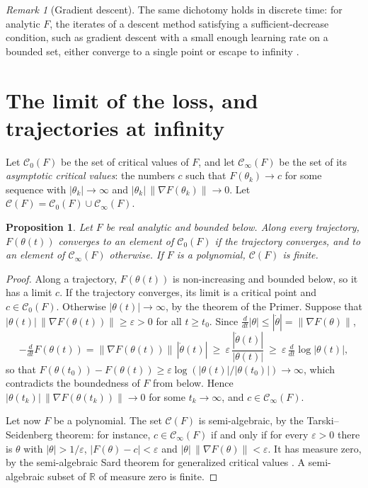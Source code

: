 \documentclass[11pt]{article}
\newtheorem{proposition}[lemma]{Proposition}
\theoremstyle{definition}
\theoremstyle{remark}
\newtheorem{remark}[lemma]{Remark}
\newcommand{\R}{\mathbb{R}}
\newcommand{\cC}{\mathcal{C}}
\begin{document}
\begin{remark}[Gradient descent]
The same dichotomy holds in discrete time: for analytic $F$, the iterates of a descent method satisfying a sufficient-decrease condition, such as gradient descent with a small enough learning rate on a bounded set, either converge to a single point or escape to infinity \cite{AMA05}.
\end{remark}

\section{The limit of the loss, and trajectories at infinity}\label{sec:limits}

Let $\cC_0(F)$ be the set of critical values of $F$, and let $\cC_\infty(F)$ be the set of its \emph{asymptotic critical values}: the numbers $c$ such that $F(\theta_k)\to c$ for some sequence with $|\theta_k|\to\infty$ and $|\theta_k|\,\|\nabla F(\theta_k)\|\to0$. Let $\cC(F)=\cC_0(F)\cup\cC_\infty(F)$.

\begin{proposition}\label{prop:limits}
Let $F$ be real analytic and bounded below. Along every trajectory, $F(\theta(t))$ converges to an element of $\cC_0(F)$ if the trajectory converges, and to an element of $\cC_\infty(F)$ otherwise. If $F$ is a polynomial, $\cC(F)$ is finite.
\end{proposition}

\begin{proof}
Along a trajectory, $F(\theta(t))$ is non-increasing and bounded below, so it has a limit $c$. If the trajectory converges, its limit is a critical point and $c\in\cC_0(F)$. Otherwise $|\theta(t)|\to\infty$, by the theorem of the Primer. Suppose that $|\theta(t)|\,\|\nabla F(\theta(t))\|\ge\varepsilon>0$ for all $t\ge t_0$. Since $\frac{d}{dt}|\theta|\le|\dot\theta|=\|\nabla F(\theta)\|$,
\[
-\tfrac{d}{dt}F(\theta(t))=\|\nabla F(\theta(t))\|\,|\dot\theta(t)|\ \ge\ \varepsilon\,\frac{|\dot\theta(t)|}{|\theta(t)|}\ \ge\ \varepsilon\,\tfrac{d}{dt}\log|\theta(t)| ,
\]
so that $F(\theta(t_0))-F(\theta(t))\ge\varepsilon\log(|\theta(t)|/|\theta(t_0)|)\to\infty$, which contradicts the boundedness of $F$ from below. Hence $|\theta(t_k)|\,\|\nabla F(\theta(t_k))\|\to0$ for some $t_k\to\infty$, and $c\in\cC_\infty(F)$.

Let now $F$ be a polynomial. The set $\cC(F)$ is semi-algebraic, by the Tarski--Seidenberg theorem: for instance, $c\in\cC_\infty(F)$ if and only if for every $\varepsilon>0$ there is $\theta$ with $|\theta|>1/\varepsilon$, $|F(\theta)-c|<\varepsilon$ and $|\theta|\,\|\nabla F(\theta)\|<\varepsilon$. It has measure zero, by the semi-algebraic Sard theorem for generalized critical values \cite{KOS00}. A semi-algebraic subset of $\R$ of measure zero is finite.
\end{proof}
\end{document}
